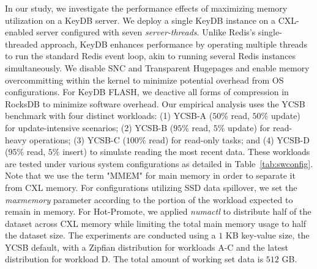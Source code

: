 In our study, we investigate the performance effects of maximizing memory utilization on a KeyDB server. We deploy a single KeyDB instance on a CXL-enabled server configured with seven \textit{server-threads}. Unlike Redis's single-threaded approach, KeyDB enhances performance by operating multiple threads to run the standard Redis event loop, akin to running several Redis instances simultaneously. We disable SNC and Transparent Hugepages and enable memory overcommitting within the kernel to minimize potential overhead from OS configurations. For KeyDB FLASH, we deactive all forms of compression in RocksDB to minimize software overhead. Our empirical analysis uses the YCSB benchmark with four distinct workloads: (1) YCSB-A ($50\%$ read, $50\%$ update) for update-intensive scenarios; (2) YCSB-B ($95\%$ read, $5\%$ update) for read-heavy operations; (3) YCSB-C ($100\%$ read) for read-only tasks; and (4) YCSB-D ($95\%$ read, $5\%$ insert) to simulate reading the most recent data. These workloads are tested under various system configurations as detailed in Table~\ref{tab:swconfig}. Note that we use the term "MMEM" for main memory in order to separate it from CXL memory. For configurations utilizing SSD data spillover, we set the \textit{maxmemory} parameter according to the portion of the workload expected to remain in memory. For Hot-Promote, we applied \textit{numactl} to distribute half of the dataset across CXL memory while limiting the total main memory usage to half the dataset size. The experiments are conducted using a $1$ KB key-value size, the YCSB default, with a Zipfian distribution for workloads A-C and the latest distribution for workload D. The total amount of working set data is $512$ GB.

